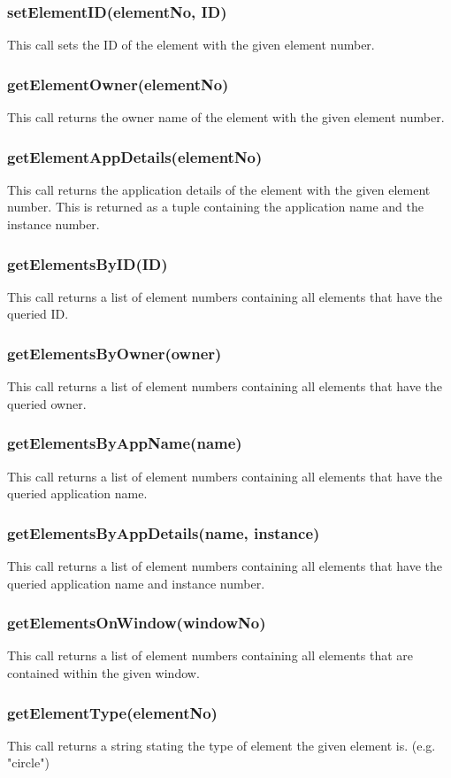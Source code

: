 \documentclass{acm_proc_article-sp}
\begin{document}
\subsubsection{setElementID(elementNo, ID)}
This call sets the ID of the element with the given element number.
\subsubsection{getElementOwner(elementNo)}
This call returns the owner name of the element with the given element number.
\subsubsection{getElementAppDetails(elementNo)}
This call returns the application details of the element with the given element number. This is returned as a tuple containing the application name and the instance number.
\subsubsection{getElementsByID(ID)}
This call returns a list of element numbers containing all elements that have the queried ID.
\subsubsection{getElementsByOwner(owner)}
This call returns a list of element numbers containing all elements that have the queried owner.
\subsubsection{getElementsByAppName(name)}
This call returns a list of element numbers containing all elements that have the queried application name.
\subsubsection{getElementsByAppDetails(name, instance)}
This call returns a list of element numbers containing all elements that have the queried application name and instance number.
\subsubsection{getElementsOnWindow(windowNo)}
This call returns a list of element numbers containing all elements that are contained within the given window.
\subsubsection{getElementType(elementNo)}
This call returns a string stating the type of element the given element is. (e.g. "circle")
\end{document}
